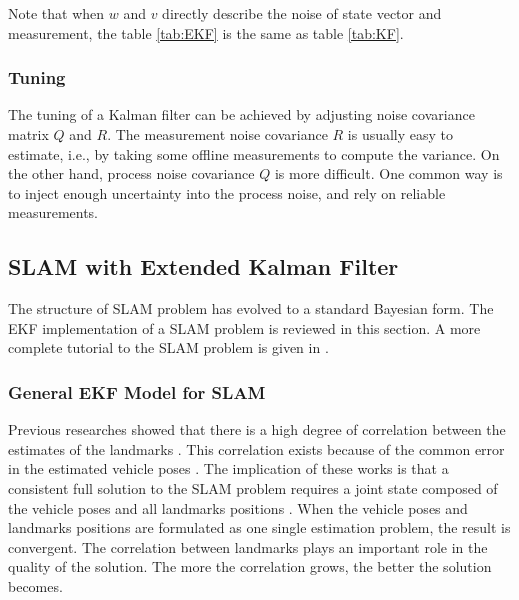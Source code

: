 \noindent Note that when $w$ and $v$ directly describe the noise of
state vector and measurement, the table \ref{tab:EKF} is the same as
table \ref{tab:KF}.

\subsubsection{Tuning}
The tuning of a Kalman filter can be achieved by adjusting noise covariance
matrix $Q$ and $R$. The measurement noise covariance $R$ is usually
easy to estimate, i.e., by taking some offline measurements to compute
the variance. On the other hand, process noise covariance $Q$ is more
difficult. One common way is to inject enough uncertainty into the
process noise, and rely on reliable measurements.
 
\subsection{SLAM with Extended Kalman Filter}
The structure of SLAM problem has evolved to a standard
Bayesian form. The EKF implementation of a SLAM problem is reviewed in
this section. A more complete tutorial to the SLAM problem is given in
\cite{durrant-whyte_simultaneous_2006}
\cite{bailey_simultaneous_2006}.

\subsubsection{General EKF Model for SLAM}
Previous researches showed that there is a high degree of correlation
between the estimates of the landmarks
\cite{smith_representation_1986} \cite{durrant-whyte_uncertain_1988}.
This correlation exists because of the common error in the estimated
vehicle poses \cite{leonard_simultaneous_1991}. The implication of
these works is that a consistent full solution to the SLAM problem
requires a joint state composed of the vehicle poses and all landmarks
positions \cite{durrant-whyte_simultaneous_2006}. When the vehicle
poses and landmarks positions are formulated as one single estimation
problem, the result is convergent. The correlation between landmarks
plays an important role in the quality of the solution. The more the
correlation grows, the better the solution becomes.
\cite{durrant-whyte_localization_1996} \cite{csorba_new_1996}
\cite{csorba_simultaneous_1997} \cite{dissanayake_solution_2001}

